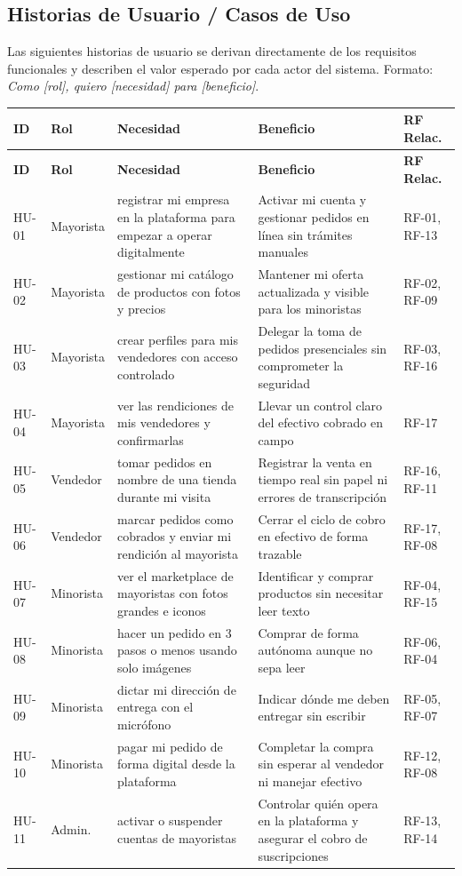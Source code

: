 \documentclass[12pt, a4paper]{article}
\begin{document}
\subsection{Historias de Usuario / Casos de Uso}

Las siguientes historias de usuario se derivan directamente de los requisitos funcionales y describen el valor esperado por cada actor del sistema. Formato: \textit{Como [rol], quiero [necesidad] para [beneficio]}.

\begin{longtable}{|C{1cm}|L{1.8cm}|L{3.5cm}|L{3.5cm}|L{2.5cm}|}
\hline
\textbf{ID} & \textbf{Rol} & \textbf{Necesidad} & \textbf{Beneficio} & \textbf{RF Relac.} \\
\hline
\endfirsthead
\hline
\textbf{ID} & \textbf{Rol} & \textbf{Necesidad} & \textbf{Beneficio} & \textbf{RF Relac.} \\
\hline
\endhead
HU-01 & Mayorista & registrar mi empresa en la plataforma para empezar a operar digitalmente & Activar mi cuenta y gestionar pedidos en línea sin trámites manuales & RF-01, RF-13 \\ \hline
HU-02 & Mayorista & gestionar mi catálogo de productos con fotos y precios & Mantener mi oferta actualizada y visible para los minoristas & RF-02, RF-09 \\ \hline
HU-03 & Mayorista & crear perfiles para mis vendedores con acceso controlado & Delegar la toma de pedidos presenciales sin comprometer la seguridad & RF-03, RF-16 \\ \hline
HU-04 & Mayorista & ver las rendiciones de mis vendedores y confirmarlas & Llevar un control claro del efectivo cobrado en campo & RF-17 \\ \hline
HU-05 & Vendedor & tomar pedidos en nombre de una tienda durante mi visita & Registrar la venta en tiempo real sin papel ni errores de transcripción & RF-16, RF-11 \\ \hline
HU-06 & Vendedor & marcar pedidos como cobrados y enviar mi rendición al mayorista & Cerrar el ciclo de cobro en efectivo de forma trazable & RF-17, RF-08 \\ \hline
HU-07 & Minorista & ver el marketplace de mayoristas con fotos grandes e iconos & Identificar y comprar productos sin necesitar leer texto & RF-04, RF-15 \\ \hline
HU-08 & Minorista & hacer un pedido en 3 pasos o menos usando solo imágenes & Comprar de forma autónoma aunque no sepa leer & RF-06, RF-04 \\ \hline
HU-09 & Minorista & dictar mi dirección de entrega con el micrófono & Indicar dónde me deben entregar sin escribir & RF-05, RF-07 \\ \hline
HU-10 & Minorista & pagar mi pedido de forma digital desde la plataforma & Completar la compra sin esperar al vendedor ni manejar efectivo & RF-12, RF-08 \\ \hline
HU-11 & Admin. & activar o suspender cuentas de mayoristas & Controlar quién opera en la plataforma y asegurar el cobro de suscripciones & RF-13, RF-14 \\ \hline
\end{longtable}
\end{document}
